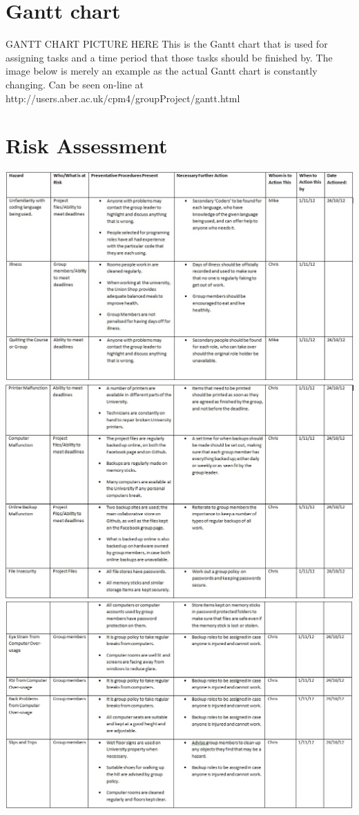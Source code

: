 \documentclass{project}
\begin{document}
\section{Gantt chart}
GANTT CHART PICTURE HERE
This is the Gantt chart that is used for assigning tasks and a time period that those
tasks should be finished by. The image below is merely an example as the actual
Gantt chart is constantly changing. Can be seen on-line at http://users.aber.ac.uk/cpm4/groupProject/gantt.html

\section{Risk Assessment}
\includegraphics[scale=0.6]{risk1.jpg}\\
\includegraphics[scale=0.6]{risk2.jpg}\\
\includegraphics[scale=0.6]{risk3.jpg}\\
\end{document}

